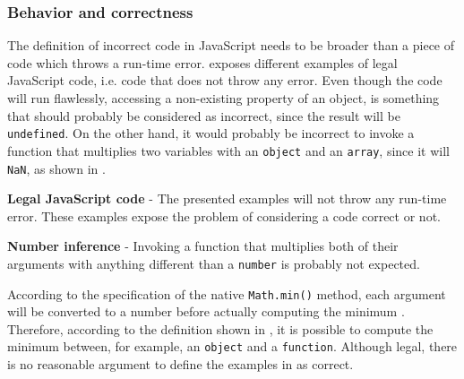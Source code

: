 \subsubsection{Behavior and correctness}
The definition of incorrect code in JavaScript needs to be broader than a piece of code which throws a run-time error.  exposes different examples of legal JavaScript code, i.e. code that does not throw any error. Even though the code will run flawlessly, accessing a non-existing property of an object, is something that should probably be considered as incorrect, since the result will be \texttt{undefined}. On the other hand, it would probably be incorrect to invoke a function that multiplies two variables with an \texttt{object} and an \texttt{array}, since it will \texttt{NaN}, as shown in .

\begin{code}
  \captionsetup{aboveskip=0pt, belowskip=10pt}
  \caption[Legal JavaScript code]{\textbf{Legal JavaScript code} - The presented examples will not throw any run-time error. These examples expose the problem of considering a code correct or not.}
  \label{code:type-inference-examples-definition-of-incorrect}
\end{code}

\begin{code}
  \captionsetup{aboveskip=0pt, belowskip=10pt}
  \caption[Number inference]{\textbf{Number inference} - Invoking a function that multiplies both of their arguments with anything different than a \texttt{number} is probably not expected.}
  \label{code:type-inference-multiply-probably-incorrect}
\end{code}



According to the specification of the native \texttt{Math.min()} method, each argument will be converted to a number before actually computing the minimum \citep{ecma-script}. Therefore, according to the definition shown in , it is possible to compute the minimum between, for example, an \texttt{object} and a \texttt{function}. Although legal, there is no reasonable argument to define the examples in  as correct.

